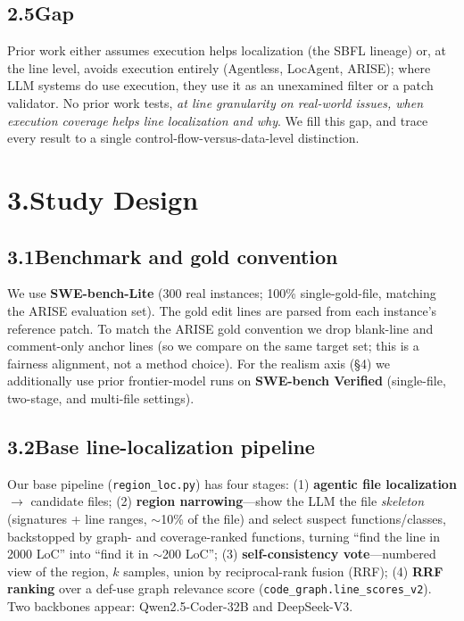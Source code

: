 \documentclass[11pt]{article}
\newcommand{\code}[1]{\texttt{#1}}
\begin{document}
\subsection*{2.5\quad Gap}
Prior work either assumes execution helps localization (the SBFL lineage) or, at the line level, avoids execution entirely (Agentless, LocAgent, ARISE); where LLM systems do use execution, they use it as an unexamined filter or a patch validator. No prior work tests, \emph{at line granularity on real-world issues, when execution coverage helps line localization and why}. We fill this gap, and trace every result to a single control-flow-versus-data-level distinction.

\section*{3.\quad Study Design}

\subsection*{3.1\quad Benchmark and gold convention}
We use \textbf{SWE-bench-Lite} (300 real instances; 100\% single-gold-file, matching the ARISE evaluation set). The gold edit lines are parsed from each instance's reference patch. To match the ARISE gold convention we drop blank-line and comment-only anchor lines (so we compare on the same target set; this is a fairness alignment, not a method choice). For the realism axis (\S4) we additionally use prior frontier-model runs on \textbf{SWE-bench Verified} (single-file, two-stage, and multi-file settings).

\subsection*{3.2\quad Base line-localization pipeline}
Our base pipeline (\code{region\_loc.py}) has four stages: (1) \textbf{agentic file localization} $\rightarrow$ candidate files; (2) \textbf{region narrowing}---show the LLM the file \emph{skeleton} (signatures + line ranges, $\sim$10\% of the file) and select suspect functions/classes, backstopped by graph- and coverage-ranked functions, turning ``find the line in 2000 LoC'' into ``find it in $\sim$200 LoC''; (3) \textbf{self-consistency vote}---numbered view of the region, $k$ samples, union by reciprocal-rank fusion (RRF); (4) \textbf{RRF ranking} over a def-use graph relevance score (\code{code\_graph.line\_scores\_v2}). Two backbones appear: Qwen2.5-Coder-32B and DeepSeek-V3.
\end{document}
